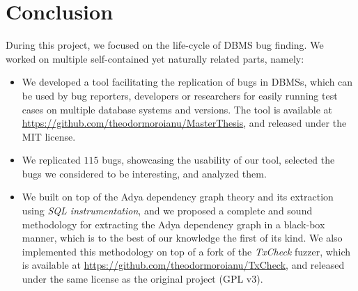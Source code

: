 \chapter{Conclusion}

During this project, we focused on the life-cycle of DBMS bug finding. We worked on multiple self-contained yet naturally related parts, namely:

\begin{itemize}
    \item We developed a tool facilitating the replication of bugs in DBMSs, which can be used by bug reporters, developers or researchers for easily running test cases on multiple database systems and versions. The tool is available at \url{https://github.com/theodormoroianu/MasterThesis}, and released under the MIT license.
    \item We replicated $115$ bugs, showcasing the usability of our tool, selected the bugs we considered to be interesting, and analyzed them. 
    \item We built on top of the Adya dependency graph theory and its extraction using \textit{SQL instrumentation}, and we proposed a complete and sound methodology for extracting the Adya dependency graph in a black-box manner, which is to the best of our knowledge the first of its kind. We also implemented this methodology on top of a fork of the \textit{TxCheck} fuzzer, which is available at \url{https://github.com/theodormoroianu/TxCheck}, and released under the same license as the original project (GPL v3). 
\end{itemize}


